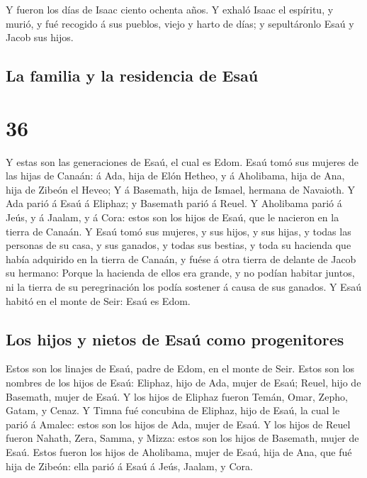 Y fueron los días de Isaac ciento ochenta años.
 Y exhaló Isaac el espíritu, y murió, y fué recogido á
sus pueblos, viejo y harto de días; y sepultáronlo Esaú y Jacob sus
hijos.

\hypertarget{la-familia-y-la-residencia-de-esauxfa}{%
\subsection{La familia y la residencia de
Esaú}\label{la-familia-y-la-residencia-de-esauxfa}}

\hypertarget{section-35}{%
\section{36}\label{section-35}}

 Y estas son las generaciones de Esaú, el cual es Edom.
 Esaú tomó sus mujeres de las hijas de Canaán: á Ada, hija
de Elón Hetheo, y á Aholibama, hija de Ana, hija de Zibeón el Heveo;
 Y á Basemath, hija de Ismael, hermana de Navaioth.
 Y Ada parió á Esaú á Eliphaz; y Basemath parió á Reuel.
 Y Aholibama parió á Jeús, y á Jaalam, y á Cora: estos son
los hijos de Esaú, que le nacieron en la tierra de Canaán.
 Y Esaú tomó sus mujeres, y sus hijos, y sus hijas, y
todas las personas de su casa, y sus ganados, y todas sus bestias, y
toda su hacienda que había adquirido en la tierra de Canaán, y fuése á
otra tierra de delante de Jacob su hermano:  Porque la
hacienda de ellos era grande, y no podían habitar juntos, ni la tierra
de su peregrinación los podía sostener á causa de sus ganados.
 Y Esaú habitó en el monte de Seir: Esaú es Edom.

\hypertarget{los-hijos-y-nietos-de-esauxfa-como-progenitores}{%
\subsection{Los hijos y nietos de Esaú como
progenitores}\label{los-hijos-y-nietos-de-esauxfa-como-progenitores}}

 Estos son los linajes de Esaú, padre de Edom, en el monte
de Seir.  Estos son los nombres de los hijos de Esaú:
Eliphaz, hijo de Ada, mujer de Esaú; Reuel, hijo de Basemath, mujer de
Esaú.  Y los hijos de Eliphaz fueron Temán, Omar, Zepho,
Gatam, y Cenaz.  Y Timna fué concubina de Eliphaz, hijo
de Esaú, la cual le parió á Amalec: estos son los hijos de Ada, mujer de
Esaú.  Y los hijos de Reuel fueron Nahath, Zera, Samma, y
Mizza: estos son los hijos de Basemath, mujer de Esaú. 
Estos fueron los hijos de Aholibama, mujer de Esaú, hija de Ana, que fué
hija de Zibeón: ella parió á Esaú á Jeús, Jaalam, y Cora.

